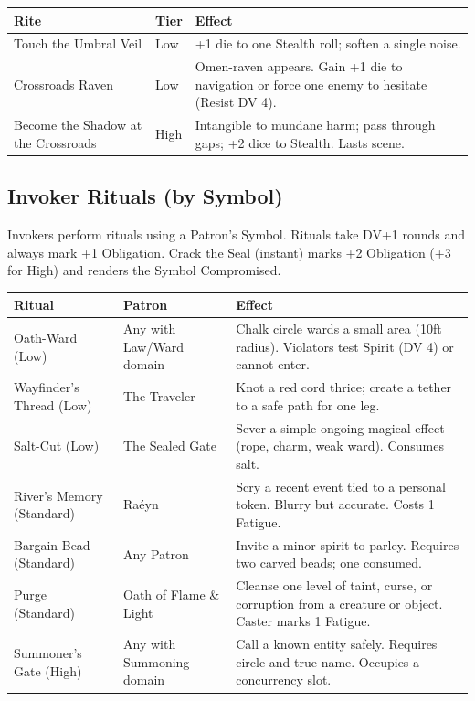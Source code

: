 \begin{tabular}{@{}l>{\raggedright\arraybackslash}p{3cm}>{\raggedright\arraybackslash}p{7cm}@{}}
\toprule
\textbf{Rite} & \textbf{Tier} & \textbf{Effect} \\
\midrule
Touch the Umbral Veil & Low & +1 die to one Stealth roll; soften a single noise. \\
Crossroads Raven & Low & Omen-raven appears. Gain +1 die to navigation or force one enemy to hesitate (Resist DV 4). \\
Become the Shadow at the Crossroads & High & Intangible to mundane harm; pass through gaps; +2 dice to Stealth. Lasts scene. \\
\bottomrule
\end{tabular}

\subsection{Invoker Rituals (by Symbol)}

Invokers perform rituals using a Patron's Symbol. Rituals take DV+1 rounds and always mark +1 Obligation. Crack the Seal (instant) marks +2 Obligation (+3 for High) and renders the Symbol Compromised.

\begin{tabular}{@{}l>{\raggedright\arraybackslash}p{3cm}>{\raggedright\arraybackslash}p{7cm}@{}}
\toprule
\textbf{Ritual} & \textbf{Patron} & \textbf{Effect} \\
\midrule
Oath-Ward (Low) & Any with Law/Ward domain & Chalk circle wards a small area (10ft radius). Violators test Spirit (DV 4) or cannot enter. \\
Wayfinder's Thread (Low) & The Traveler & Knot a red cord thrice; create a tether to a safe path for one leg. \\
Salt-Cut (Low) & The Sealed Gate & Sever a simple ongoing magical effect (rope, charm, weak ward). Consumes salt. \\
River's Memory (Standard) & Ra\'eyn & Scry a recent event tied to a personal token. Blurry but accurate. Costs 1 Fatigue. \\
Bargain-Bead (Standard) & Any Patron & Invite a minor spirit to parley. Requires two carved beads; one consumed. \\
Purge (Standard) & Oath of Flame \& Light & Cleanse one level of taint, curse, or corruption from a creature or object. Caster marks 1 Fatigue. \\
Summoner's Gate (High) & Any with Summoning domain & Call a known entity safely. Requires circle and true name. Occupies a concurrency slot. \\
\bottomrule
\end{tabular}

